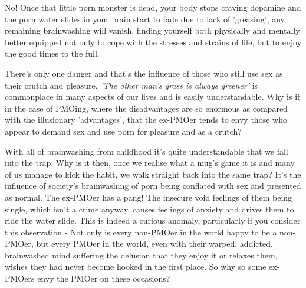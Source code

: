 \documentclass[easypeasy.tex]{subfiles}
\begin{document}
No! Once that little porn monster is dead, your body stops craving dopamine and the porn water slides in your brain start to fade due to lack of 'greasing', any remaining brainwashing will vanish, finding yourself both physically and mentally better equipped not only to cope with the stresses and strains of life, but to enjoy the good times to the full.

There's only one danger and that's the influence of those who still use sex as their crutch and pleasure. \textit{'The other man's grass is always greener'} is commonplace in many aspects of our lives and is easily understandable. Why is it in the case of PMOing, where the disadvantages are so enormous as compared with the illusionary 'advantages', that the ex-PMOer tends to envy those who appear to demand sex and use porn for pleasure and as a crutch?

With all of brainwashing from childhood it's quite understandable that we fall into the trap. Why is it then, once we realise what a mug's game it is and many of us manage to kick the habit, we walk straight back into the same trap? It's the influence of society's brainwashing of porn being conflated with sex and presented as normal. The ex-PMOer has a pang! The insecure void feelings of them being single, which isn't a crime anyway, causes feelings of anxiety and drives them to ride the water slide. This is indeed a curious anomaly, particularly if you consider this observation - Not only is every non-PMOer in the world happy to be a non-PMOer, but every PMOer in the world, even with their warped, addicted, brainwashed mind suffering the delusion that they enjoy it or relaxes them, wishes they had never become hooked in the first place. So why so some ex-PMOers envy the PMOer on these occasions?
\end{document}
